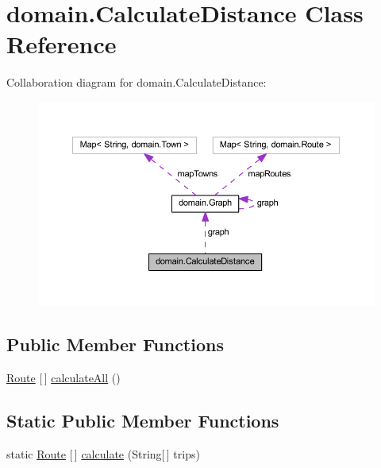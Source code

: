 \hypertarget{classdomain_1_1_calculate_distance}{}\section{domain.\+Calculate\+Distance Class Reference}
\label{classdomain_1_1_calculate_distance}


Collaboration diagram for domain.\+Calculate\+Distance\+:\nopagebreak
\begin{figure}[H]
\begin{center}
\leavevmode
\includegraphics[width=350pt]{classdomain_1_1_calculate_distance__coll__graph}
\end{center}
\end{figure}
\subsection*{Public Member Functions}
\begin{DoxyCompactItemize}
\item 
\hyperlink{classdomain_1_1_route}{Route} \mbox{[}$\,$\mbox{]} \hyperlink{classdomain_1_1_calculate_distance_a188113ff0f6a119f4addd523b5e06a9c}{calculate\+All} ()
\end{DoxyCompactItemize}
\subsection*{Static Public Member Functions}
\begin{DoxyCompactItemize}
\item 
static \hyperlink{classdomain_1_1_route}{Route} \mbox{[}$\,$\mbox{]} \hyperlink{classdomain_1_1_calculate_distance_ad08ace3a0aa30e9ec6c99e8826630ad3}{calculate} (String\mbox{[}$\,$\mbox{]} trips)
\end{DoxyCompactItemize}
